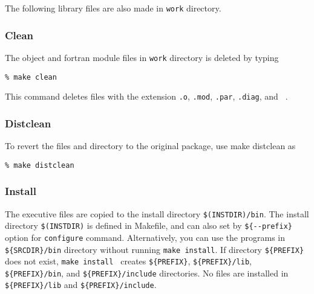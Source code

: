 %
The following library files are also made in {\tt work} directory.
%
%

\subsubsection{Clean}
The object and fortran module files in {\tt work} directory is deleted by typing
\begin{verbatim}
% make clean
\end{verbatim}
This command deletes files with the extension {\tt .o}, {\tt .mod}, {\tt .par}, {\tt .diag}, and {\tt ~}.

\subsubsection{Distclean}
To revert the files and directory to the original package, use make distclean as
\begin{verbatim}
% make distclean
\end{verbatim}

\subsubsection{Install}
 The executive files are copied to the install directory \verb|$(INSTDIR)/bin|. The install directory \verb|$(INSTDIR)| is defined in Makefile, and can also set by  \verb|${--prefix}| option for \verb|configure| command. Alternatively, you can use the programs in \verb|${SRCDIR}/bin| directory without running \verb|make install|. If directory \verb|${PREFIX}| does not exist, \verb|make install | creates  \verb|${PREFIX}|,  \verb|${PREFIX}/lib|,  \verb|${PREFIX}/bin|, and  \verb|${PREFIX}/include| directories. No files are installed in \verb|${PREFIX}/lib| and \verb|${PREFIX}/include|.

